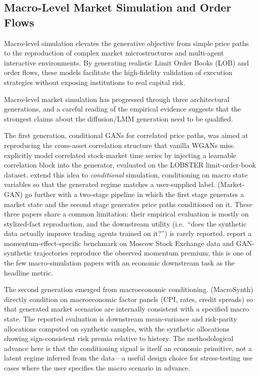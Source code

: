 \subsection{Macro-Level Market Simulation and Order Flows}

Macro-level simulation elevates the generative objective from simple price paths to the reproduction of complex market microstructures and multi-agent interactive environments. By generating realistic Limit Order Books (LOB) and order flows, these models facilitate the high-fidelity validation of execution strategies without exposing institutions to real capital risk.

Macro-level market simulation has progressed through three architectural generations, and a careful reading of the empirical evidence suggests that the strongest claims about the diffusion/LMM generation need to be qualified.

The first generation, conditional GANs for correlated price paths, was aimed at reproducing the cross-asset correlation structure that vanilla WGANs miss. \citep{CoMeTS-GAN} explicitly model correlated stock-market time series by injecting a learnable correlation block into the generator, evaluated on the LOBSTER limit-order-book dataset. \citep{istiaque2024cts} extend this idea to \emph{conditional} simulation, conditioning on macro state variables so that the generated regime matches a user-supplied label. \citep{xia2024market} (Market-GAN) go further with a two-stage pipeline in which the first stage generates a market state and the second stage generates price paths conditioned on it. These three papers share a common limitation: their empirical evaluation is mostly on stylized-fact reproduction, and the downstream utility (i.e.\ ``does the synthetic data actually improve trading agents trained on it?'') is rarely reported. \citep{GAN-MoEx} report a momentum-effect-specific benchmark on Moscow Stock Exchange data and GAN-synthetic trajectories reproduce the observed momentum premium; this is one of the few macro-simulation papers with an economic downstream task as the headline metric.

The second generation emerged from macroeconomic conditioning. \citep{alex2024macroeconomic} (MacroSynth) directly condition on macroeconomic factor panels (CPI, rates, credit spreads) so that generated market scenarios are internally consistent with a specified macro state. The reported evaluation is downstream mean-variance and risk-parity allocations computed on synthetic samples, with the synthetic allocations showing sign-consistent risk premia relative to history. The methodological advance here is that the conditioning signal is itself an economic primitive, not a latent regime inferred from the data---a useful design choice for stress-testing use cases where the user specifies the macro scenario in advance.

